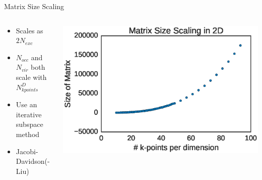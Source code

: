 \documentclass[10pt]{beamer}
\begin{document}
{{{{{{{{{{{\begin{frame}{Matrix Size Scaling}
	\begin{columns}[c] %
		\begin{column}{.4\textwidth}
			\begin{itemize}
				\item {Scales as $2N_{exc}$}
				\item {$N_{occ}$ and $N_{vir}$ both scale with $N_{kpoints}^D$}
				\item {Use an iterative subspace method }
				\item {Jacobi-Davidson(-Liu)}
			\end{itemize}
		\end{column}
		\hfill
		\begin{column}{0.6\textwidth}
		    \begin{overprint}
			    \includegraphics[width=\linewidth]{../../images/matscale.eps}

			\end{overprint}
		\end{column}
	\end{columns}
\end{frame}


}}}}}}}}}}}
\end{document}
